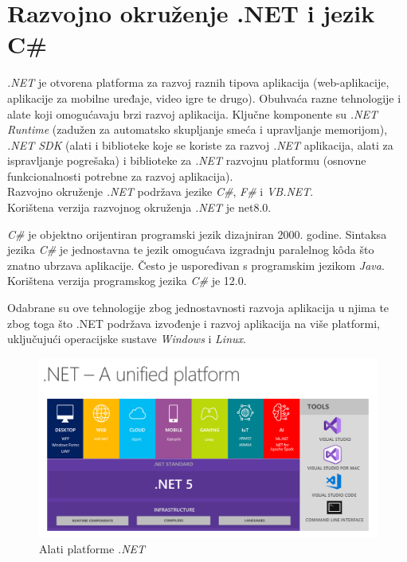 \documentclass[zavrsnirad]{fer}
\begin{document}
\section{Razvojno okruženje .NET i jezik C\#}
\textit{.NET} je otvorena platforma za razvoj raznih tipova aplikacija (web-aplikacije, aplikacije za mobilne uređaje, video igre te drugo). Obuhvaća razne tehnologije i alate koji omogućavaju brzi razvoj aplikacija. Ključne komponente su \textit{.NET Runtime} (zadužen za automatsko skupljanje smeća i upravljanje memorijom), \textit{.NET SDK} (alati i biblioteke koje se koriste za razvoj \textit{.NET} aplikacija, alati za ispravljanje pogrešaka) i biblioteke za \textit{.NET} razvojnu platformu (osnovne funkcionalnosti potrebne za razvoj aplikacija).
\\Razvojno okruženje \textit{.NET} podržava jezike \textit{C\#}, \textit{F\#} i \textit{VB.NET}.
\\Korištena verzija razvojnog okruženja \textit{.NET} je net8.0.

\textit{C\#} je objektno orijentiran programski jezik dizajniran 2000. godine. Sintaksa jezika \textit{C\#} je jednostavna te jezik omogućava izgradnju paralelnog kôda što znatno ubrzava aplikacije. Često je uspoređivan s programskim jezikom \textit{Java}.
\\Korištena verzija programskog jezika \textit{C\#} je 12.0.

Odabrane su ove tehnologije zbog jednostavnosti razvoja aplikacija u njima te zbog toga što .NET podržava izvođenje i razvoj aplikacija na više platformi, uključujući operacijske sustave \textit{Windows} i \textit{Linux}.

\begin{figure}[htb]
	\centering
	\includegraphics[trim={0 0 15cm 5cm},clip,width=1\linewidth]{images/dotnet5_platform.png} 
	\caption{Alati platforme \textit{.NET} \cite{dotnet_descr}}
	\label{slk:dotnet}
\end{figure}
\FloatBarrier
\end{document}
